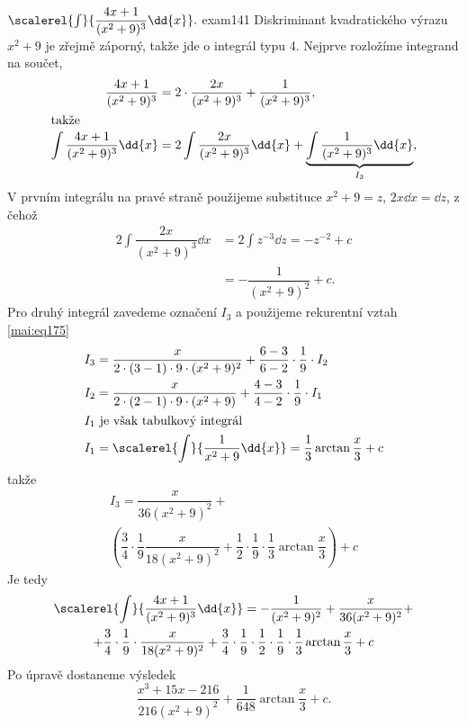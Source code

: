 \begin{mathexam}{\(\protect\scalerel{\int}{\dfrac{4x + 1}{(x^2 + 9)^3}\dd{x}}.\)
  \hfill\cite[s.~76]{Knichal}}{exam141} 
  Diskriminant kvadratického výrazu \(x^2+9\) je zřejmě záporný, takže jde o integrál typu 4.
  Nejprve rozložíme integrand na součet,
  \begin{align*}
    \dfrac{4x+1}{(x^2+9)^3} 
      &= 2\cdot\dfrac{2x}{(x^2+9)^3} + \dfrac{1}{(x^2+9)^3},             \\
    \shortintertext{takže}
    \int\dfrac{4x+1}{(x^2+9)^3}\dd{x} 
      &= 2\int\dfrac{2x}{(x^2+9)^3}\dd{x} + \underbrace{\int\dfrac{1}{(x^2+9)^3}\dd{x}}_{I_3},
  \end{align*}
  V prvním integrálu na pravé straně použijeme substituce \(x^2+9=z\), \(2x\dd{x} = \dd{z}\), z
  čehož 
  \begin{align*}
    2\int\dfrac{2x}{(x^2+9)^3}\dd{x} 
      &= 2\int z^{-3}\dd{z} = -z^{-2} + c  \\
      &= -\dfrac{1}{(x^2+9)^2} + c.
  \end{align*}  
  Pro druhý integrál zavedeme označení \(I_3\) a použijeme rekurentní vztah \ref{mai:eq175}
  \begin{align*}
    I_3 &= \dfrac{x}{2\cdot(3-1)\cdot9\cdot(x^2+9)^2}+\dfrac{6-3}{6-2}\cdot\dfrac{1}{9}\cdot I_2\\
    I_2 &= \dfrac{x}{2\cdot(2-1)\cdot9\cdot(x^2+9)  }+\dfrac{4-3}{4-2}\cdot\dfrac{1}{9}\cdot I_1\\
    \shortintertext{\(I_1\) je však tabulkový integrál}
    I_1 &= \scalerel{\int}{\dfrac{1}{x^2+9}\dd{x}} = \dfrac{1}{3}\arctan\dfrac{x}{3} + c
  \end{align*}
  takže
  \begin{multline*}
    I_3 = 
      \dfrac{x}{36(x^2+9)^2} +        \\
        \left(
          \dfrac{3}{4}\cdot\dfrac{1}{9}\dfrac{x}{18(x^2+9)^2} + 
          \dfrac{1}{2}\cdot\dfrac{1}{9}\cdot\dfrac{1}{3}\arctan\dfrac{x}{3}
        \right) + c
  \end{multline*}
  Je tedy
  \begin{multline*}
    \scalerel{\int}{\dfrac{4x + 1}{(x^2 + 9)^3}\dd{x}} 
      = - \dfrac{1}{(x^2+9)^2} + \dfrac{x}{36(x^2+9)^2} +            \\
        + \dfrac{3}{4}\cdot\dfrac{1}{9}\cdot\dfrac{x}{18(x^2+9)^2}
        + \dfrac{3}{4}\cdot\dfrac{1}{9}\cdot\dfrac{1}{2}\cdot
          \dfrac{1}{9}\cdot\dfrac{1}{3}\arctan\dfrac{x}{3} + c
  \end{multline*}
  Po úpravě dostaneme výsledek
  \begin{equation*}
    \dfrac{x^3+15x-216}{216(x^2+9)^2} + \dfrac{1}{648}\arctan\dfrac{x}{3} + c.
  \end{equation*}
\end{mathexam}